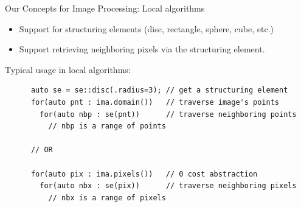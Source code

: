 \documentclass[12pt,aspectratio=169]{beamer}
\begin{document}
\begin{frame}[fragile]{Our Concepts for Image Processing: Local algorithms}
  \begin{itemize}
    \item Support for structuring elements (disc, rectangle, sphere, cube, etc.)
    \item Support retrieving neighboring pixels via the structuring element.
  \end{itemize}
  Typical usage in local algorithms:

  \begin{verbatim}
      auto se = se::disc(.radius=3); // get a structuring element
      for(auto pnt : ima.domain())   // traverse image's points
        for(auto nbp : se(pnt))      // traverse neighboring points
          // nbp is a range of points

      // OR

      for(auto pix : ima.pixels())   // 0 cost abstraction
        for(auto nbx : se(pix))      // traverse neighboring pixels
          // nbx is a range of pixels
  \end{verbatim}
  \pdfcomment[icon=Note]{   }
\end{frame}
\end{document}
